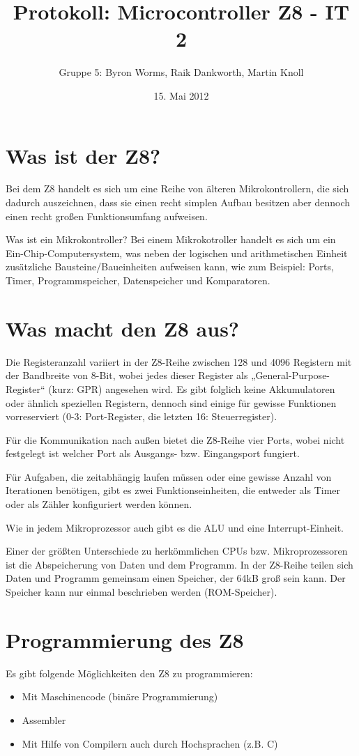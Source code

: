 \documentclass[a4paper,11pt]{article}
\title{Protokoll: Microcontroller Z8 - IT 2}
\author{Gruppe 5: Byron Worms, Raik Dankworth, Martin Knoll}
\date{15. Mai 2012}
\begin{document}
\begin{titlepage}
\maketitle
\end{titlepage}

\section{Was ist der Z8?}
Bei dem Z8 handelt es sich um eine Reihe von älteren Mikrokontrollern, die sich dadurch auszeichnen, dass sie einen recht simplen Aufbau besitzen aber dennoch einen recht großen Funktionsumfang aufweisen. 

Was ist ein Mikrokontroller?
 Bei einem Mikrokotroller handelt es sich um ein Ein-Chip-Computersystem, was neben der logischen und arithmetischen Einheit zusätzliche Bausteine/Baueinheiten aufweisen kann, wie zum Beispiel: Ports, Timer, Programmspeicher, Datenspeicher und Komparatoren.

\section{Was macht den Z8 aus?}
Die Registeranzahl variiert in der Z8-Reihe zwischen 128 und 4096 Registern mit der Bandbreite von 8-Bit, wobei  jedes dieser Register als „General-Purpose-Register“ (kurz: GPR) angesehen wird. Es gibt folglich keine Akkumulatoren oder ähnlich speziellen Registern, dennoch sind einige für gewisse Funktionen vorreserviert (0-3: Port-Register, die letzten 16: Steuerregister). 

Für die Kommunikation nach außen bietet die Z8-Reihe vier Ports, wobei nicht festgelegt ist welcher Port als Ausgangs- bzw. Eingangsport fungiert. 

Für Aufgaben, die zeitabhängig laufen müssen oder eine gewisse Anzahl von Iterationen benötigen, gibt es zwei Funktionseinheiten, die entweder als Timer oder als Zähler konfiguriert werden können. 

Wie in jedem Mikroprozessor auch gibt es die ALU und eine Interrupt-Einheit. 

Einer der größten Unterschiede zu herkömmlichen CPUs bzw. Mikroprozessoren ist die Abspeicherung von Daten und dem Programm. 
In der Z8-Reihe teilen sich Daten und Programm gemeinsam einen Speicher, der 64kB groß sein kann. 
Der Speicher kann nur einmal beschrieben werden (ROM-Speicher). 

\section{Programmierung des Z8}
Es gibt folgende Möglichkeiten den Z8 zu programmieren:
\begin{itemize}
  \item Mit Maschinencode (binäre Programmierung)
  \item Assembler
  \item Mit Hilfe von Compilern auch durch Hochsprachen (z.B. C)
\end{itemize}
\end{document}
